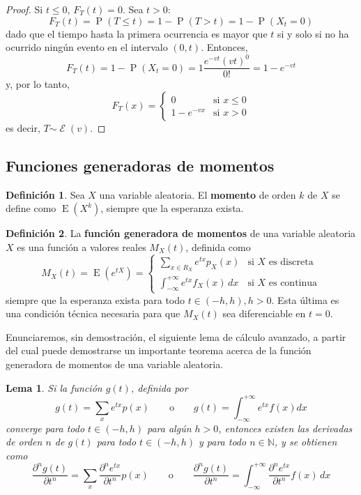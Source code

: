 \documentclass[11pt]{article}
\theoremstyle{plain}
\newtheorem*{lema}{Lema}
\theoremstyle{definition}
\newtheorem*{defi}{Definición}
\theoremstyle{remark}
\newcommand{\deft}[1]{\textbf{#1}}  %
\newcommand{\proba}{\ensuremath{\operatorname{P}}}  %
\newcommand{\esp}[0]{\ensuremath{\operatorname{E}}}  %
\newcommand{\dist}[1]{\ensuremath{\sim \operatorname{#1}}}  %
\newcommand{\exponen}[0]{\ensuremath{\mathcal{E}}}  %
\begin{document}
      \begin{proof}
        Si $t \leq 0$, $F_T(t) = 0$. Sea $t > 0$:
        \[ F_T(t) = \proba(T \leq t) = 1 - \proba(T > t) = 1 - \proba(X_t = 0) \]
        dado que el tiempo hasta la primera ocurrencia es mayor que $t$ si y solo si no ha ocurrido ningún evento en el intervalo $(0, t)$. Entonces,
        \[ F_T(t) = 1 - \proba(X_t = 0) = 1 \frac{e^{-vt} (vt)^0}{0!} = 1 - e^{-vt} \]
        y, por lo tanto,
        \[ F_T(x) = \begin{cases}
          0 & \text{si $x \leq 0$} \\
          1 - e^{-vx} & \text{si $x > 0$}
        \end{cases} \]
        es decir, $T \dist{\exponen}(v)$.
      \end{proof}

  \subsection{Funciones generadoras de momentos}

    \begin{defi}
      Sea $X$ una variable aleatoria. El \deft{momento} de orden $k$ de $X$ se define como $\esp\left(X^k\right)$, siempre que la esperanza exista.
    \end{defi}

    \begin{defi}
      La \deft{función generadora de momentos} de una variable aleatoria $X$ es una función a valores reales $M_X(t)$, definida como
      \[ M_X(t) = \esp\left(e^{tX}\right) = \begin{cases}
        \displaystyle \sum_{x \in R_X} e^{tx} p_X(x) & \text{si $X$ es discreta} \\
        \displaystyle \int_{-\infty}^{+\infty} e^{tx} f_X(x) \,dx & \text{si $X$ es continua}
      \end{cases} \]
      siempre que la esperanza exista para todo $t \in (-h, h), h > 0$. Esta última es una condición técnica necesaria para que $M_X(t)$ sea diferenciable en $t = 0$.
    \end{defi}

    Enunciaremos, sin demostración, el siguiente lema de cálculo avanzado, a partir del cual puede demostrarse un importante teorema acerca de la función generadora de momentos de una variable aleatoria.
    \begin{lema}
      Si la función $g(t)$, definida por
      \[ g(t) = \sum_x e^{tx} p(x) \qquad \text{o} \qquad g(t) = \int_{-\infty}^{+\infty} e^{tx} f(x) dx \]
      converge para todo $t \in (-h, h)$ para algún $h > 0$, entonces existen las derivadas de orden $n$ de $g(t)$ para todo $t \in (-h,h)$ y para todo $n \in \mathbb{N}$, y se obtienen como
      \[ \frac{\partial^n g(t)}{\partial t^n} = \sum_x \frac{\partial^n e^{tx}}{\partial t^n} p(x) \qquad \text{o} \qquad \frac{\partial^n g(t)}{\partial t^n} = \int_{-\infty}^{+ \infty} \frac{\partial^n e^{tx}}{\partial t^n} f(x) \,dx \]
    \end{lema}
\end{document}
